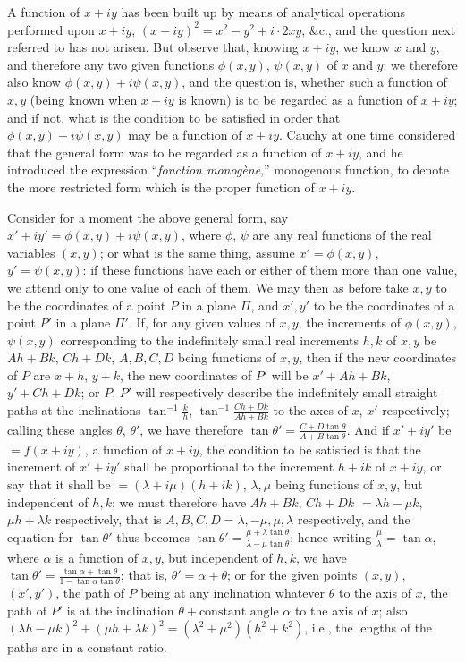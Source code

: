 \documentclass[11pt,a4paper]{article}
\begin{document}
A function of $x + iy$ has been built up by means of analytical operations performed upon $x + iy$, $(x + iy)^{2} = x^{2} - y^{2} + i \cdot 2xy$, \&c., and the question next referred to has not arisen. But observe that, knowing $x + iy$, we know $x$ and $y$, and therefore any two given functions $\phi(x, y)$, $\psi(x, y)$ of $x$ and $y$: we therefore also know $\phi(x, y) + i\psi(x, y)$, and the question is, whether such a function of $x, y$ (being known when $x + iy$ is known) is to be regarded as a function of $x + iy$; and if not, what is the condition to be satisfied in order that $\phi(x, y) + i\psi(x, y)$ may be a function of $x + iy$. Cauchy at one time considered that the general form was to be regarded as a function of $x + iy$, and he introduced the expression ``\textit{fonction monog\`{e}ne},'' monogenous function, to denote the more restricted form which is the proper function of $x + iy$.

Consider for a moment the above general form, say $x' + iy' = \phi(x, y) + i\psi(x, y)$, where $\phi$, $\psi$ are any real functions of the real variables $(x, y)$; or what is the same thing, assume $x' = \phi(x, y)$, $y' = \psi(x, y)$: if these functions have each or either of them more than one value, we attend only to one value of each of them. We may then as before take $x, y$ to be the coordinates of a point $P$ in a plane $\Pi$, and $x', y'$ to be the coordinates of a point $P'$ in a plane $\Pi'$. If, for any given values of $x, y$, the increments of $\phi(x, y)$, $\psi(x, y)$ corresponding to the indefinitely small real increments $h, k$ of $x, y$ be $Ah + Bk$, $Ch + Dk$, $A, B, C, D$ being functions of $x, y$, then if the new coordinates of $P$ are $x + h$, $y + k$, the new coordinates of $P'$ will be $x' + Ah + Bk$, $y' + Ch + Dk$; or $P$, $P'$ will respectively describe the indefinitely small straight paths at the inclinations $\tan^{-1}\frac{k}{h}$, $\tan^{-1}\frac{Ch + Dk}{Ah + Bk}$ to the axes of $x$, $x'$ respectively; calling these angles $\theta$, $\theta'$, we have therefore $\tan\theta' = \frac{C + D\tan\theta}{A + B\tan\theta}$. And if $x' + iy'$ be $= f(x + iy)$, a function of $x + iy$, the condition to be satisfied is that the increment of $x' + iy'$ shall be proportional to the increment $h + ik$ of $x + iy$, or say that it shall be $= (\lambda + i\mu)(h + ik)$, $\lambda, \mu$ being functions of $x, y$, but independent of $h, k$; we must therefore have $Ah + Bk$, $Ch + Dk$ $= \lambda h - \mu k$, $\mu h + \lambda k$ respectively, that is $A, B, C, D = \lambda, -\mu, \mu, \lambda$ respectively, and the equation for $\tan\theta'$ thus becomes $\tan\theta' = \frac{\mu + \lambda\tan\theta}{\lambda - \mu\tan\theta}$; hence writing $\frac{\mu}{\lambda} = \tan\alpha$, where $\alpha$ is a function of $x, y$, but independent of $h, k$, we have $\tan\theta' = \frac{\tan\alpha + \tan\theta}{1 - \tan\alpha\tan\theta}$; that is, $\theta' = \alpha + \theta$; or for the given points $(x, y)$, $(x', y')$, the path of $P$ being at any inclination whatever $\theta$ to the axis of $x$, the path of $P'$ is at the inclination $\theta + \text{constant angle } \alpha$ to the axis of $x$; also $(\lambda h - \mu k)^{2} + (\mu h + \lambda k)^{2} = (\lambda^{2} + \mu^{2})(h^{2} + k^{2})$, i.e., the lengths of the paths are in a constant ratio.
\end{document}
